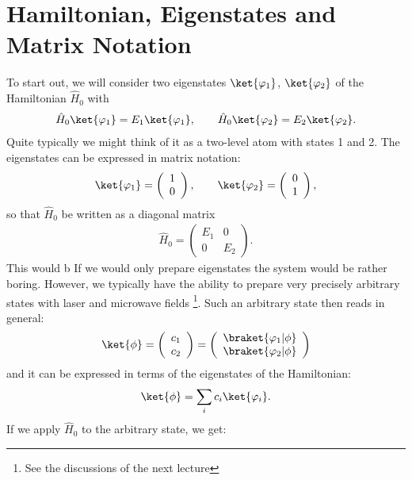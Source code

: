 \section{Hamiltonian, Eigenstates and Matrix Notation}

To start out, we will consider two eigenstates $\ket{\varphi_1}$, $\ket{\varphi_2}$ of the Hamiltonian $\hat{H}_0$ with
\begin{align}
 \hat{H}_0\ket{\varphi_1}=E_1\ket{\varphi_1}, \qquad \hat{H}_0\ket{\varphi_2}=E_2\ket{\varphi_2}.
\end{align}
Quite typically we might think of it as a two-level atom with states 1 and 2. The eigenstates can be expressed in matrix notation:
\begin{align}
 \ket{\varphi_1}=\left( \begin{array}{c} 1 \\ 0 \end{array} \right), \qquad \ket{\varphi_2}=\left( \begin{array}{c} 0 \\ 1 \end{array} \right),
\end{align}
so that $\hat{H}_0$ be written as a diagonal matrix
\begin{align}
    \hat{H}_0 = \left(\begin{array}{cc} E_1 & 0 \\ 0 & E_2 \end{array}\right).
\end{align}
This would b
If we would only prepare eigenstates the system would be rather boring. However, we typically have the ability to prepare very precisely arbitrary states with laser and microwave fields \footnote{See the discussions of the next lecture}. Such an arbitrary state then reads in general:
\begin{align}
 \ket{\phi} = \left( \begin{array}{c} c_1 \\ c_2 \end{array} \right) = \left( \begin{array}{c} \braket{\varphi_1|\phi} \\ \braket{\varphi_2|\phi} \end{array} \right)
\end{align}
and it can be expressed in terms of the eigenstates of the Hamiltonian:
\begin{align}
	\ket{\phi} = \sum_i c_i \ket{\varphi_i}.
\end{align}
If we apply $\hat{H}_0$ to the arbitrary state, we get:

